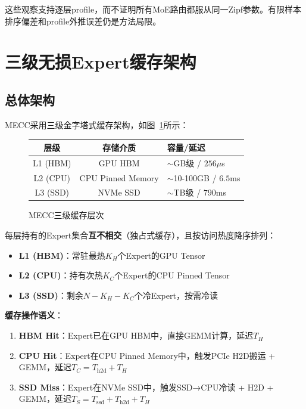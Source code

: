 \documentclass[11pt,a4paper]{article}
\begin{document}
这些观察支持逐层profile，而不证明所有MoE路由都服从同一Zipf参数。有限样本排序偏差和profile外推误差仍是方法局限。

\section{三级无损Expert缓存架构}

\subsection{总体架构}

MECC采用三级金字塔式缓存架构，如图~\ref{fig:architecture}所示：

\begin{figure}[h]
\centering
\begin{tabular}{|c|c|l|}
\hline
\textbf{层级} & \textbf{存储介质} & \textbf{容量/延迟} \\
\hline
L1 (HBM) & GPU HBM & $\sim$GB级 / $256\mu$s \\
L2 (CPU) & CPU Pinned Memory & $\sim$10-100GB / $6.5$ms \\
L3 (SSD) & NVMe SSD & $\sim$TB级 / $790$ms \\
\hline
\end{tabular}
\caption{MECC三级缓存层次}
\label{fig:architecture}
\end{figure}

每层持有的Expert集合\textbf{互不相交}（独占式缓存），且按访问热度降序排列：
\begin{itemize}
    \item \textbf{L1 (HBM)}：常驻最热$K_H$个Expert的GPU Tensor
    \item \textbf{L2 (CPU)}：持有次热$K_C$个Expert的CPU Pinned Tensor
    \item \textbf{L3 (SSD)}：剩余$N-K_H-K_C$个冷Expert，按需冷读
\end{itemize}

\textbf{缓存操作语义}：
\begin{enumerate}
    \item \textbf{HBM Hit}：Expert已在GPU HBM中，直接GEMM计算，延迟$T_H$
    \item \textbf{CPU Hit}：Expert在CPU Pinned Memory中，触发PCIe H2D搬运 + GEMM，延迟$T_C = T_{\text{h2d}} + T_H$
    \item \textbf{SSD Miss}：Expert在NVMe SSD中，触发SSD→CPU冷读 + H2D + GEMM，延迟$T_S = T_{\text{ssd}} + T_{\text{h2d}} + T_H$
\end{enumerate}
\end{document}
